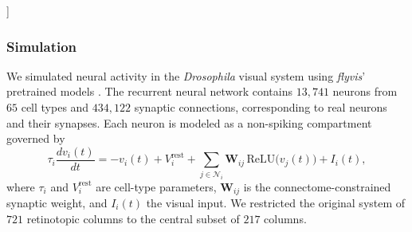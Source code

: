 \documentclass[12pt,twocolumn]{article}
\begin{document}
\begin{@twocolumnfalse}
\vspace*{0.5em}

\end{@twocolumnfalse} 
]

\subsubsection*{Simulation}
We simulated neural activity in the \emph{Drosophila} visual system using \textit{flyvis}' pretrained models \cite{lappalainen_connectome-constrained_2024}.  The recurrent neural network contains $13,741$ neurons from $65$ cell types and $434,122$ synaptic connections, corresponding to real neurons and their synapses. Each neuron is modeled as a non-spiking compartment governed by
%
\small%
\begin{equation*}
\tau_i\frac{dv_i(t)}{dt} = -v_i(t) + V_i^{\text{rest}}
+ \sum_{j\in\mathcal{N}_i}\mathbf{W}_{ij}\,
  \text{ReLU}\!\big(v_j(t)\big)
+ I_i(t),
\label{eq:simulated_update}
\end{equation*}
\normalsize%
where $\tau_i$ and $V_i^{\mathrm{rest}}$ are cell-type parameters, $\mathbf{W}_{ij}$ is the connectome-constrained synaptic weight, and $I_i(t)$ the visual input.  We restricted the original system of $721$ retinotopic columns to the central subset of $217$ columns. 



\vspace*{-1.em}
\end{document}
